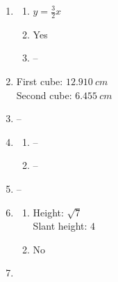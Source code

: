 \documentclass{article}
\begin{document}
\begin{enumerate}
\begin{enumerate}
	\item $28 \pi \ mi.^2$
	
	\item --
	
	\item $14 \pi \ mi.$
	
	\item --
	
	\end{enumerate}
	
\item

	\begin{enumerate}
	
	\item $y = \frac{3}{2}x$
	
	\item Yes
	
	\item --
	
	\end{enumerate}
	
\item First cube: $12.910 \ cm$ \\
	Second cube: $6.455 \ cm$
	
\item --

\item

	\begin{enumerate}
	
	\item --
	
	\item --
	
	\end{enumerate}
	
\item --

\item

	\begin{enumerate}
	
	\item Height: $\sqrt{7}$ \\
		Slant height: $4$
		
	\item No
	
	\end{enumerate}
	
\item

	\begin{enumerate}
	

\end{enumerate}
\end{enumerate}
\end{document}
